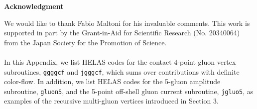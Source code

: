 \documentclass[a4paper,11pt]{article}
\begin{document}
\begin{center}
{\bf Acknowledgment}
\end{center}
We would like to thank Fabio Maltoni for his invaluable comments.  This work is supported in part by
 the Grant-in-Aid for Scientific Research (No. 20340064)
 from the Japan Society for the Promotion of Science.\\

\vspace{1em}
\\

In this Appendix, we list HELAS codes for the contact 4-point
 gluon vertex subroutines,
 {\tt ggggcf} and {\tt jgggcf},
 which sums over contributions with definite color-flow.
 In addition, we list HELAS codes for the 5-gluon
 amplitude subroutine, {\tt gluon5}, and
 the 5-point off-shell gluon current subroutine,
 {\tt jgluo5}, as examples of the recursive multi-gluon
 vertices introduced in Section 3.\\
\end{document}
